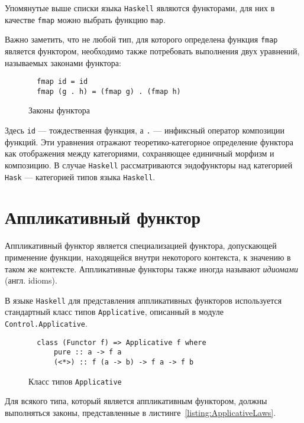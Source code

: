   Упомянутые выше списки языка \lstinline{Haskell} являются функторами, для них в
  качестве \lstinline{fmap} можно выбрать функцию \lstinline{map}.

  Важно заметить, что не любой тип, для которого определена функция
  \lstinline{fmap} является функтором, необходимо также потребовать выполнения
  двух уравнений, называемых законами функтора:

  \begin{figure}[h]
  \begin{lstlisting}
  fmap id = id
  fmap (g . h) = (fmap g) . (fmap h)
  \end{lstlisting}
  \caption{Законы функтора}
  \label{listing:FunctorLaws}
  \end{figure}

  Здесь \lstinline{id} --- тождественная функция, а \lstinline{.} --- инфиксный
  оператор композиции функций. Эти уравнения отражают теоретико-категорное
  определение функтора как отображения между категориями, сохраняющее единичный
  морфизм и композицию. В случае \lstinline{Haskell} рассматриваются эндофункторы
  над категорией \lstinline{Hask} --- категорией типов языка \lstinline{Haskell}.

\section{Аппликативный функтор}

  Аппликативный функтор является специализацией функтора, допускающей применение
  функции, находящейся внутри некоторого контекста, к значению в таком же
  контексте. Аппликативные функторы также иногда называют \emph{идиомами}
  (англ. idioms).

  В языке \lstinline{Haskell} для представления аппликативных функторов
  используется стандартный класс типов \lstinline{Applicative},
  описанный в модуле \lstinline{Control.Applicative}.

  \begin{figure}[h]
  \begin{lstlisting}
  class (Functor f) => Applicative f where
      pure :: a -> f a
      (<*>) :: f (a -> b) -> f a -> f b
  \end{lstlisting}
  \caption{Класс типов \lstinline{Applicative}}
  \label{listing:Applicative}
  \end{figure}

  Для всякого типа, который является аппликативным функтором, должны выполняться
  законы, представленные в листинге~\ref{listing:ApplicativeLaws}.

